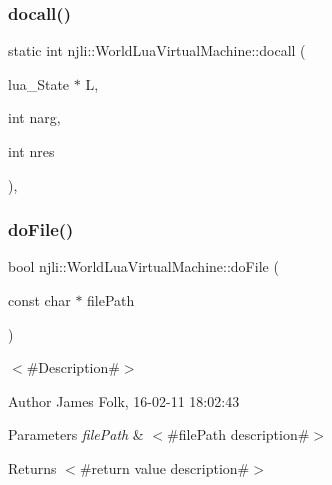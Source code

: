 \subsubsection{\texorpdfstring{docall()}{docall()}}
{\footnotesize\ttfamily static int njli\+::\+World\+Lua\+Virtual\+Machine\+::docall (\begin{DoxyParamCaption}\item[{lua\+\_\+\+State $\ast$}]{L,  }\item[{int}]{narg,  }\item[{int}]{nres }\end{DoxyParamCaption})\hspace{0.3cm}{\ttfamily [static]}, {\ttfamily [private]}}

\mbox{\label{classnjli_1_1_world_lua_virtual_machine_a859edc6a83d71fec3722ad76313eef43}} 
\subsubsection{\texorpdfstring{do\+File()}{doFile()}}
{\footnotesize\ttfamily bool njli\+::\+World\+Lua\+Virtual\+Machine\+::do\+File (\begin{DoxyParamCaption}\item[{const char $\ast$}]{file\+Path }\end{DoxyParamCaption})}



$<$\#\+Description\#$>$ 

\begin{DoxyAuthor}{Author}
James Folk, 16-\/02-\/11 18\+:02\+:43
\end{DoxyAuthor}

\begin{DoxyParams}{Parameters}
{\em file\+Path} & $<$\#file\+Path description\#$>$\\
\hline
\end{DoxyParams}
\begin{DoxyReturn}{Returns}
$<$\#return value description\#$>$ 
\end{DoxyReturn}
\mbox{\label{classnjli_1_1_world_lua_virtual_machine_a56e072d74d6c9810533e395ae44ec49c}} 
